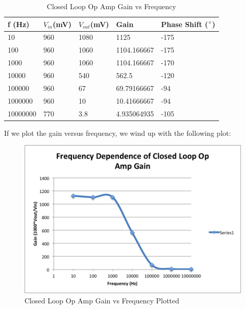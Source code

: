 \documentclass{article}
\begin{document}
    \begin{table}[H]
        \centering
        \caption{Closed Loop Op Amp Gain vs Frequency}
        \label{my-label}
        \begin{tabular}{lllll}
        \textbf{f (Hz)} & \textbf{$V_{in}$(mV)} & \textbf{$V_{out}$(mV)} & \textbf{Gain} & \textbf{Phase Shift ($\degree$)} \\ \hline
        10 & 960 & 1080 & 1125 & -175 \\
        100 & 960 & 1060 & 1104.166667 & -175 \\
        1000 & 960 & 1060 & 1104.166667 & -170 \\
        10000 & 960 & 540 & 562.5 & -120 \\
        100000 & 960 & 67 & 69.79166667 & -94 \\
        1000000 & 960 & 10 & 10.41666667 & -94 \\
        10000000 & 770 & 3.8 & 4.935064935 & -105
        \end{tabular}
        \end{table}
    If we plot the gain versus frequency, we wind up with the following plot:
    \begin{figure}[H]
        \centering
        \includegraphics[scale = 0.5]{4a.png}
        \caption{Closed Loop Op Amp Gain vs Frequency Plotted}
        \label{fig:my_label}
    \end{figure}

\end{document}
